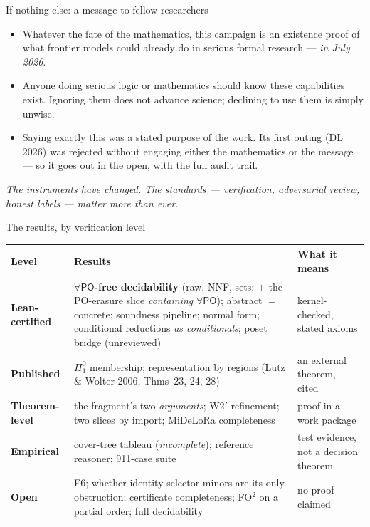 \documentclass[aspectratio=169,11pt]{beamer}
\newcommand{\PO}{\mathsf{PO}}
\begin{document}
\begin{frame}{If nothing else: a message to fellow researchers}
\begin{itemize}
  \item Whatever the fate of the mathematics, this campaign is an
        \alert{existence proof} of what frontier models could already do in
        serious formal research --- \emph{in July 2026}.
  \item Anyone doing serious logic or mathematics should \alert{know} these
        capabilities exist. Ignoring them does not advance science;
        declining to use them is simply unwise.
  \item Saying exactly this was a stated purpose of the work. Its first
        outing (DL 2026) was rejected without engaging either the
        mathematics or the message --- so it goes out
        \alert{in the open}, with the full audit trail.
\end{itemize}
\vfill
\begin{center}
\emph{The instruments have changed. The standards --- verification,
adversarial review, honest labels --- matter more than ever.}
\end{center}
\end{frame}

\begin{frame}{The results, by verification level}
\begin{center}
\scriptsize
\renewcommand{\arraystretch}{0.86}
\begin{tabular}{@{}p{2.3cm}p{6.1cm}p{2.6cm}@{}}
\toprule
\textbf{Level} & \textbf{Results} & \textbf{What it means}\\
\midrule
\textcolor{good}{\textbf{Lean-certified}} &
  \textbf{$\forall\PO$-free decidability} (raw, NNF, sets; $+$ the
  PO-erasure slice \emph{containing} $\forall\PO$); abstract $=$ concrete;
  soundness pipeline; normal form; conditional reductions \emph{as
  conditionals}; poset bridge (unreviewed) &
  kernel-checked, stated axioms\\
\addlinespace
\textbf{Published} &
  $\Pi^0_1$ membership; representation by regions (Lutz \& Wolter 2006,
  Thms~23, 24, 28) &
  an external theorem, cited\\
\addlinespace
\textbf{Theorem-level} &
  the fragment's two \emph{arguments}; W2$'$ refinement; two slices by
  import; MiDeLoRa completeness &
  proof in a work package\\
\addlinespace
\textbf{Empirical} &
  cover-tree tableau (\emph{incomplete}); reference reasoner; 911-case suite &
  test evidence, not a decision theorem\\
\addlinespace
\textcolor{openc}{\textbf{Open}} &
  F6; whether identity-selector minors are its only obstruction;
  certificate completeness; FO$^2$ on a partial order; full decidability &
  no proof claimed\\
\bottomrule
\end{tabular}
\end{center}
\vfill

\end{frame}
\end{document}
